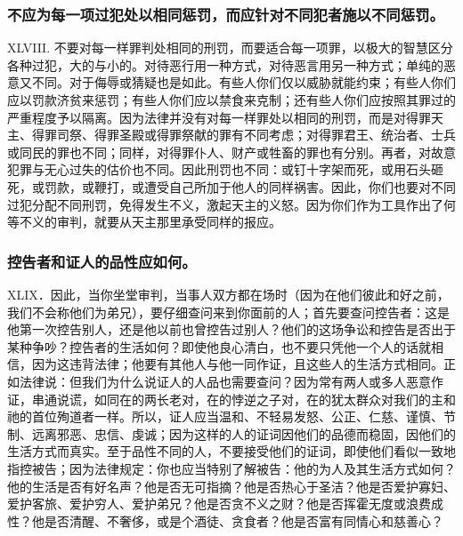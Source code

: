 
\subsubsection{不应为每一项过犯处以相同惩罚，而应针对不同犯者施以不同惩罚。}

XLVIII. 不要对每一样罪判处相同的刑罚，而要适合每一项罪，以极大的智慧区分各种过犯，大的与小的。对待恶行用一种方式，对待恶言用另一种方式；单纯的恶意又不同。对于侮辱或猜疑也是如此。有些人你们仅以威胁就能约束；有些人你们应以罚款济贫来惩罚；有些人你们应以禁食来克制；还有些人你们应按照其罪过的严重程度予以隔离。因为法律并没有对每一样罪处以相同的刑罚，而是对得罪天主、得罪司祭、得罪圣殿或得罪祭献的罪有不同考虑；对得罪君王、统治者、士兵或同民的罪也不同；同样，对得罪仆人、财产或牲畜的罪也有分别。再者，对故意犯罪与无心过失的估价也不同。因此刑罚也不同：或钉十字架而死，或用石头砸死，或罚款，或鞭打，或遭受自己所加于他人的同样祸害。因此，你们也要对不同过犯分配不同刑罚，免得发生不义，激起天主的义怒。因为你们作为工具作出了何等不义的审判，就要从天主那里承受同样的报应。\par


\subsubsection{控告者和证人的品性应如何。}

XLIX．因此，当你坐堂审判，当事人双方都在场时（因为在他们彼此和好之前，我们不会称他们为弟兄），要仔细查问来到你面前的人；首先要查问控告者：这是他第一次控告别人，还是他以前也曾控告过别人？他们的这场争讼和控告是否出于某种争吵？控告者的生活如何？即使他良心清白，也不要只凭他一个人的话就相信，因为这违背法律；他要有其他人与他一同作证，且这些人的生活方式相同。正如法律说：但我们为什么说证人的人品也需要查问？因为常有两人或多人恶意作证，串通说谎，如同在的两长老对，在的悖逆之子对，在的犹太群众对我们的主和祂的首位殉道者一样。所以，证人应当温和、不轻易发怒、公正、仁慈、谨慎、节制、远离邪恶、忠信、虔诚；因为这样的人的证词因他们的品德而稳固，因他们的生活方式而真实。至于品性不同的人，不要接受他们的证词，即使他们看似一致地指控被告；因为法律规定：你也应当特别了解被告：他的为人及其生活方式如何？他的生活是否有好名声？他是否无可指摘？他是否热心于圣洁？他是否爱护寡妇、爱护客旅、爱护穷人、爱护弟兄？他是否贪不义之财？他是否挥霍无度或浪费成性？他是否清醒、不奢侈，或是个酒徒、贪食者？他是否富有同情心和慈善心？\par


